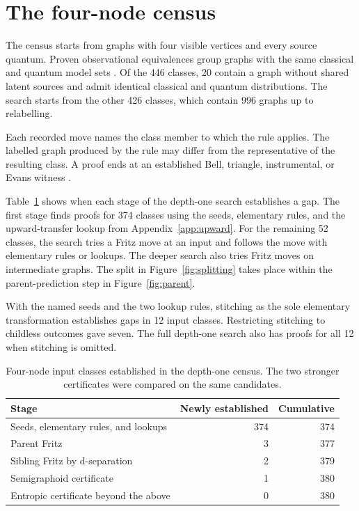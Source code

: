 \section{The four-node census}\label{sec:census}
The census starts from graphs with four visible vertices and every source quantum.
Proven observational equivalences group graphs with the same classical
and quantum model sets \cite{Repo}. Of the 446 classes, 20 contain a graph
without shared latent sources and admit identical classical and quantum
distributions. The search starts from the other 426 classes, which
contain 996 graphs up to relabelling.

Each recorded move names the class member to which the rule applies.
The labelled graph produced by the rule may differ from the representative
of the resulting class. A proof ends at an established Bell, triangle,
instrumental, or Evans witness \cite{Bell,Fritz,Instrumental,EvansGap}.

Table~\ref{tab:census} shows when each stage of the depth-one search
establishes a gap. The first stage finds proofs for 374 classes using
the seeds, elementary rules, and the upward-transfer lookup from
Appendix~\ref{app:upward}. For the remaining 52 classes, the search
tries a Fritz move at an input and follows the move with elementary
rules or lookups. The deeper search also tries Fritz moves on intermediate
graphs. The split in Figure~\ref{fig:splitting} takes place within the
parent-prediction step in Figure~\ref{fig:parent}.

With the named seeds and the two lookup rules, stitching as the sole
elementary transformation establishes gaps in 12 input classes. Restricting
stitching to childless outcomes gave seven. The full depth-one search also
has proofs for all 12 when stitching is omitted.

\begin{table}[htbp]
\centering
\caption{Four-node input classes established in the depth-one census. The two
stronger certificates were compared on the same candidates.}\label{tab:census}
\begin{tabular}{@{}lrr@{}}
\toprule
Stage & Newly established & Cumulative\\
\midrule
Seeds, elementary rules, and lookups & 374 & 374\\
Parent Fritz & 3 & 377\\
Sibling Fritz by d-separation & 2 & 379\\
Semigraphoid certificate & 1 & 380\\
Entropic certificate beyond the above & 0 & 380\\
\bottomrule
\end{tabular}
\end{table}

